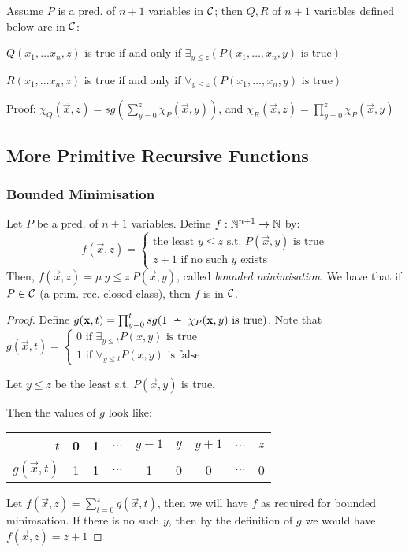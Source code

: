 \begin{itemize}
	Assume $ P $ is a pred. of $ n + 1 $ variables in $ \mathcal{C} $; then $ Q, R $ of $ n + 1 $ variables defined below are in $ \mathcal{C} $:
	
	$ Q(x_1, \dots x_n, z) $ is true if and only if $ \exists_{y \le z} (P(x_1, \dots, x_n, y) \text{ is true})$
	
	$ R(x_1, \dots x_n, z) $ is true if and only if $ \forall_{y \le z} (P(x_1, \dots, x_n, y) \text{ is true})$
	
	\subitem Proof: $ \chi_Q (\vec{x}, z) = sg(\sum_{y=0}^{z} \chi_P(\vec{x}, y)) $, and $ \chi_R (\vec{x}, z) = \prod_{y=0}^{z} \chi_P(\vec{x}, y) $
	
\end{itemize}

\subsection{More Primitive Recursive Functions}

\subsubsection{Bounded Minimisation}

Let $ P $ be a pred. of $ n + 1 $ variables. Define $ f: \mathbb{N}^{n+1} \to \mathbb{N} $ by:
\begin{equation*}
f(\vec{x}, z) = \begin{cases}
\text{the least } y \le z \text{ s.t. } P(\vec{x}, y) \text{ is true}\\
z + 1 \text{ if no such } y \text{ exists}
\end{cases}
\end{equation*}
Then, $ f(\vec{x}, z) = \mu ~ {y \le z} ~ P(\vec{x}, y) $, called \textit{bounded minimisation}. We have that if $ P \in \mathcal{C}$ (a prim. rec. closed class), then $ f $ is in $ \mathcal{C} $.

\begin{proof}
	
Define $ g(\vec{x}, t) = \prod_{y=0}^{t} sg(1 \monus \chi_P(\vec{x}, y) \text{ is true})$. Note that $ g(\vec{x}, t) =  \begin{cases}
0 \text{ if } \exists_{y \le t} P(x, y) \text{ is true}\\
1 \text{ if } \forall_{y \le t} P(x, y) \text{ is false}
\end{cases} $

Let $ y \le z $ be the least s.t. $ P(\vec{x}, y) $ is true.

Then the values of $ g $ look like: \begin{tabular}{r | c c c c c c c c}
	$ t $ & 0 & 1 & $ \dots $ & $ y - 1 $ & $ y $ & $ y + 1 $ & $ \dots $ & $ z $ \\ \hline
	$ g(\vec{x}, t) $ & 1 & 1 & $ \dots $ & 1 & 0 & 0 & $ \dots $ & 0 
\end{tabular}

Let $ f(\vec{x}, z) = \sum_{t=0}^{z} g(\vec{x}, t) $, then we will have $ f $ as required for bounded minimsation. If there is no such $ y $, then by the definition of $ g $ we would have $ f(\vec{x}, z) = z + 1 $

\end{proof}

